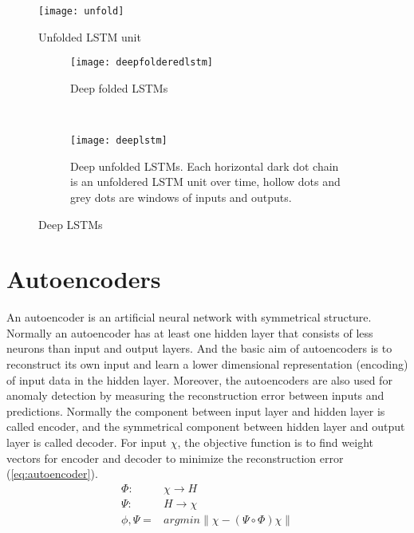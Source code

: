 \begin{figure}[h]
\centering
\texttt{[image: unfold]}
\caption[Unfolded LSTM unit]{Unfolded LSTM unit}
\label{fig:unfolded}
\end{figure}

\begin{figure}[hb]
\centering
	\begin {subfigure}[t]{0.45\textwidth}
	\centering
	\texttt{[image: deepfolderedlstm]}
	\caption{Deep folded LSTMs}
	\label{fig:deeplstm1}
	\end{subfigure}
	~
	\begin {subfigure}[t]{0.45\textwidth}
	\centering
	\texttt{[image: deeplstm]}
	\caption{Deep unfolded LSTMs. Each horizontal dark dot chain is an unfoldered LSTM unit over time, hollow dots and grey dots are windows of inputs and outputs.}
	\label{fig:deeplstm2}
	\end{subfigure}
	\caption[Deep LSTMs]{Deep LSTMs}
\label{fig:deeplstm}

\end{figure}

\section{Autoencoders}
\label{sec:Autoencoders}

An autoencoder is an artificial neural network with symmetrical structure. Normally an autoencoder has at least one hidden layer that consists of less neurons than input and output layers. And the basic aim of autoencoders is to reconstruct its own input and learn a lower dimensional representation (encoding) of input data in the hidden layer. Moreover, the autoencoders are also used for anomaly detection by measuring the reconstruction error between inputs and predictions.
Normally the component between input layer and hidden layer is called encoder, and the symmetrical component between hidden layer and output layer is called decoder. For input $\chi$, the objective function is to find weight vectors for encoder and decoder to minimize the reconstruction error (\ref{eq:autoencoder}).
\begin{equation} \label{eq:autoencoder}
\begin{aligned}
\Phi : &\chi \rightarrow H \\
\Psi : &H \rightarrow \chi \\
\phi, \Psi = &argmin \left \| \chi-(\Psi \circ \Phi)\chi \right \| 
\end{aligned}
\end{equation}

